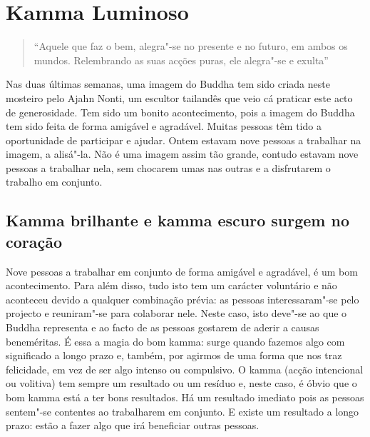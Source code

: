 
\chapter{Kamma Luminoso}


\begin{quote}
  ``Aquele que faz o bem, alegra"-se no presente e no futuro, em ambos os mundos. Relembrando as suas acções puras, ele alegra"-se e exulta''

\end{quote}

Nas duas últimas semanas, uma imagem do Buddha tem sido criada neste mosteiro
pelo Ajahn Nonti, um escultor tailandês que veio cá praticar este acto de
generosidade. Tem sido um bonito acontecimento, pois a imagem do Buddha tem sido
feita de forma amigável e agradável. Muitas pessoas têm tido a oportunidade de
participar e ajudar. Ontem estavam nove pessoas a trabalhar na imagem, a
alisá"-la. Não é uma imagem assim tão grande, contudo estavam nove pessoas a
trabalhar nela, sem chocarem umas nas outras e a disfrutarem o trabalho em
conjunto.

\section{Kamma brilhante e kamma escuro surgem no coração}

Nove pessoas a trabalhar em conjunto de forma amigável e agradável, é um bom
acontecimento. Para além disso, tudo isto tem um carácter voluntário e não
aconteceu devido a qualquer combinação prévia: as pessoas interessaram"-se pelo
projecto e reuniram"-se para colaborar nele. Neste caso, isto deve"-se ao que o
Buddha representa e ao facto de as pessoas gostarem de aderir a causas
beneméritas. É essa a magia do bom kamma: surge quando fazemos algo com
significado a longo prazo e, também, por agirmos de uma forma que nos traz
felicidade, em vez de ser algo intenso ou compulsivo. O kamma (acção intencional
ou volitiva) tem sempre um resultado ou um resíduo e, neste caso, é óbvio que o
bom kamma está a ter bons resultados. Há um resultado imediato pois as pessoas
sentem"-se contentes ao trabalharem em conjunto. E existe um resultado a longo
prazo: estão a fazer algo que irá beneficiar outras pessoas.

